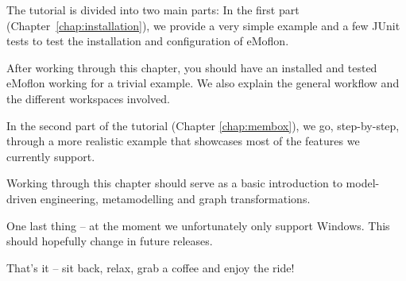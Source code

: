 The tutorial is divided into two main parts:  In the first part (Chapter~\ref{chap:installation}), we provide a very simple example and a few JUnit tests to test the installation and configuration of eMoflon.

After working through this chapter, you should have an installed and tested eMoflon working for a trivial example.
We also explain the general workflow and the different workspaces involved.

In the second part of the tutorial (Chapter \ref{chap:membox}), we go, step-by-step, through a more realistic example that showcases most of the features we currently support.

Working through this chapter should serve as a basic introduction to model-driven engineering, metamodelling and graph transformations.

One last thing -- at the moment we unfortunately only support Windows. 
This should hopefully change in future releases.

That's it -- sit back, relax, grab a coffee and enjoy the ride!


